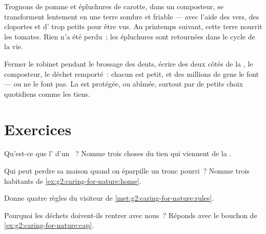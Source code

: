 \begin{example}[Le composteur]\label{ex:g2:caring-for-nature:compost}
Trognons de pomme et épluchures de carotte, dans un composteur, se
transforment lentement en une terre sombre et friable --- avec
l'aide des vers, des cloportes et d' trop petits pour
être vus. Au printemps suivant, cette terre nourrit les tomates.
Rien n'a été perdu~; les épluchures sont retournées dans le cycle de
la vie.
\end{example}

\begin{remark}\label{rem:g2:caring-for-nature:count}
Fermer le robinet pendant le brossage des dents, écrire des deux
côtés de la , le composteur, le déchet remporté~: chacun est
petit, et des millions de gens le font --- ou ne le font pas. La
 est protégée, ou abîmée, surtout par de petits choix
quotidiens comme les tiens.
\end{remark}

\section{Exercices}

\begin{exercise}[$\star$]\label{exo:g2:caring-for-nature:1}
Qu'est-ce que l' d'un ~? Nomme trois choses
du tien qui viennent de la .
\end{exercise}

\begin{exercise}[$\star$]\label{exo:g2:caring-for-nature:2}
Qui peut perdre sa maison quand on éparpille un tronc pourri~?
Nomme trois habitants de \cref{ex:g2:caring-for-nature:home}.
\end{exercise}

\begin{exercise}[$\star$]\label{exo:g2:caring-for-nature:3}
Donne quatre règles du visiteur de
\cref{met:g2:caring-for-nature:rules}.
\end{exercise}

\begin{exercise}[$\star$]\label{exo:g2:caring-for-nature:4}
Pourquoi les déchets doivent-ils rentrer avec nous~? Réponds avec le
bouchon de \cref{ex:g2:caring-for-nature:cap}.
\end{exercise}

